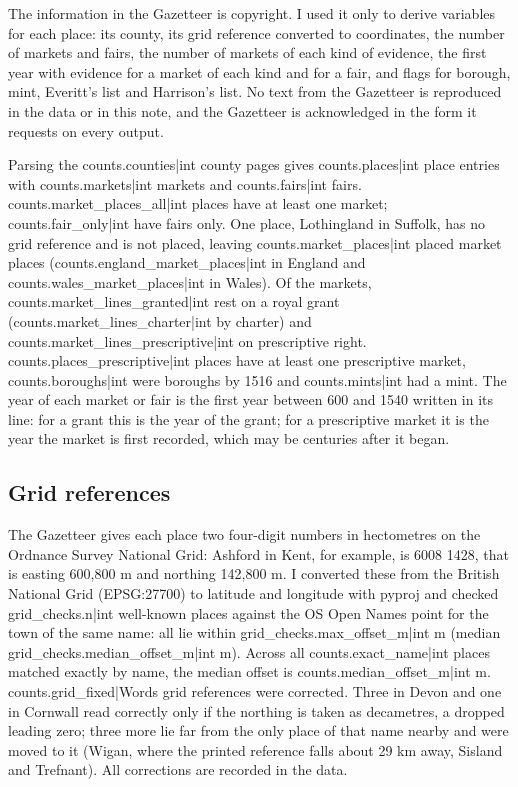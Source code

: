 \documentclass[11pt,a4paper]{article}
\begin{document}
The information in the Gazetteer is copyright. I used it only to derive variables for each place: its county, its grid reference converted to coordinates, the number of markets and fairs, the number of markets of each kind of evidence, the first year with evidence for a market of each kind and for a fair, and flags for borough, mint, Everitt's list and Harrison's list. No text from the Gazetteer is reproduced in the data or in this note, and the Gazetteer is acknowledged in the form it requests on every output.

Parsing the {{counts.counties|int}} county pages gives {{counts.places|int}} place entries with {{counts.markets|int}} markets and {{counts.fairs|int}} fairs. {{counts.market_places_all|int}} places have at least one market; {{counts.fair_only|int}} have fairs only. One place, Lothingland in Suffolk, has no grid reference and is not placed, leaving {{counts.market_places|int}} placed market places ({{counts.england_market_places|int}} in England and {{counts.wales_market_places|int}} in Wales). Of the markets, {{counts.market_lines_granted|int}} rest on a royal grant ({{counts.market_lines_charter|int}} by charter) and {{counts.market_lines_prescriptive|int}} on prescriptive right. {{counts.places_prescriptive|int}} places have at least one prescriptive market, {{counts.boroughs|int}} were boroughs by 1516 and {{counts.mints|int}} had a mint. The year of each market or fair is the first year between 600 and 1540 written in its line: for a grant this is the year of the grant; for a prescriptive market it is the year the market is first recorded, which may be centuries after it began.

\subsection{Grid references}

The Gazetteer gives each place two four-digit numbers in hectometres on the Ordnance Survey National Grid: Ashford in Kent, for example, is 6008 1428, that is easting 600,800 m and northing 142,800 m. I converted these from the British National Grid (EPSG:27700) to latitude and longitude with pyproj and checked {{grid_checks.n|int}} well-known places against the OS Open Names point for the town of the same name: all lie within {{grid_checks.max_offset_m|int}} m (median {{grid_checks.median_offset_m|int}} m). Across all {{counts.exact_name|int}} places matched exactly by name, the median offset is {{counts.median_offset_m|int}} m. {{counts.grid_fixed|Words}} grid references were corrected. Three in Devon and one in Cornwall read correctly only if the northing is taken as decametres, a dropped leading zero; three more lie far from the only place of that name nearby and were moved to it (Wigan, where the printed reference falls about 29 km away, Sisland and Trefnant). All corrections are recorded in the data.
\end{document}
